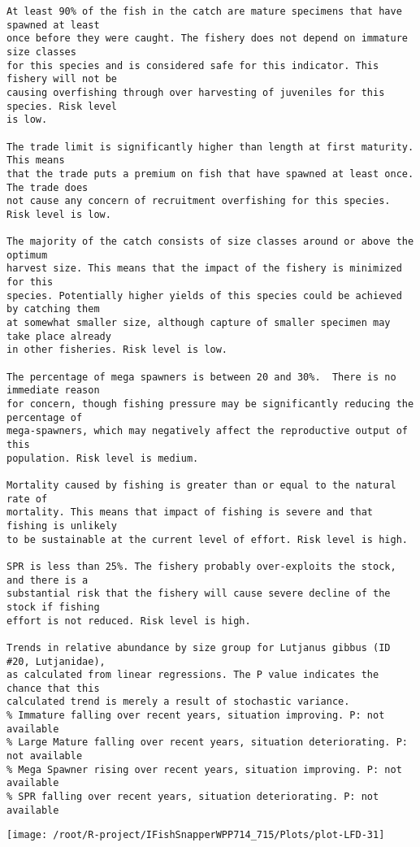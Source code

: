 \documentclass{report}\usepackage[]{graphicx}\usepackage[]{color}
\makeatletter
\def\maxwidth{ %
  \ifdim\Gin@nat@width>\linewidth
    \linewidth
  \else
    \Gin@nat@width
  \fi
}
\newenvironment{kframe}{%
 \def\at@end@of@kframe{}%
 \ifinner\ifhmode%
  \def\at@end@of@kframe{\end{minipage}}%
  \begin{minipage}{\columnwidth}%
 \fi\fi%
 \def\FrameCommand##1{\hskip\@totalleftmargin \hskip-\fboxsep
 \colorbox{shadecolor}{##1}\hskip-\fboxsep
     \hskip-\linewidth \hskip-\@totalleftmargin \hskip\columnwidth}%
 \MakeFramed {\advance\hsize-\width
   \@totalleftmargin\z@ \linewidth\hsize
   \@setminipage}}%
 {\par\unskip\endMakeFramed%
 \at@end@of@kframe}
\newenvironment{knitrout}{}{} %
\makeatother
\begin{document}
\begin{knitrout}
\begin{kframe}
\begin{verbatim}
At least 90% of the fish in the catch are mature specimens that have spawned at least
once before they were caught. The fishery does not depend on immature size classes
for this species and is considered safe for this indicator. This fishery will not be
causing overfishing through over harvesting of juveniles for this species. Risk level
is low.

The trade limit is significantly higher than length at first maturity.  This means
that the trade puts a premium on fish that have spawned at least once. The trade does
not cause any concern of recruitment overfishing for this species. Risk level is low.

The majority of the catch consists of size classes around or above the optimum
harvest size. This means that the impact of the fishery is minimized for this
species. Potentially higher yields of this species could be achieved by catching them
at somewhat smaller size, although capture of smaller specimen may take place already
in other fisheries. Risk level is low.

The percentage of mega spawners is between 20 and 30%.  There is no immediate reason
for concern, though fishing pressure may be significantly reducing the percentage of
mega-spawners, which may negatively affect the reproductive output of this
population. Risk level is medium.
 
Mortality caused by fishing is greater than or equal to the natural rate of
mortality. This means that impact of fishing is severe and that fishing is unlikely
to be sustainable at the current level of effort. Risk level is high.
 
SPR is less than 25%. The fishery probably over-exploits the stock, and there is a
substantial risk that the fishery will cause severe decline of the stock if fishing
effort is not reduced. Risk level is high.
 
Trends in relative abundance by size group for Lutjanus gibbus (ID #20, Lutjanidae),
as calculated from linear regressions. The P value indicates the chance that this
calculated trend is merely a result of stochastic variance.
% Immature falling over recent years, situation improving. P: not available
% Large Mature falling over recent years, situation deteriorating. P: not available
% Mega Spawner rising over recent years, situation improving. P: not available
% SPR falling over recent years, situation deteriorating. P: not available
\end{verbatim}
\end{kframe}
\texttt{[image: /root/R-project/IFishSnapperWPP714\_715/Plots/plot-LFD-31]} 


\end{knitrout}
\end{document}
